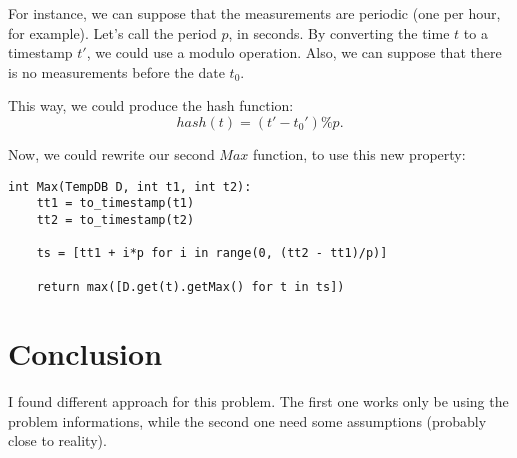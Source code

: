 		For instance, we can suppose that the measurements are periodic (one per hour, for example). Let's call the period $p$, in seconds.
		By converting the time $t$ to a timestamp $t'$, we could use a modulo operation.
		Also, we can suppose that there is no measurements before the date $t_0$.

		This way, we could produce the hash function:\[hash(t) = (t' - t_0') \% p .\]

		Now, we could rewrite our second $Max$ function, to use this new property:
\begin{lstlisting}
int Max(TempDB D, int t1, int t2):
	tt1 = to_timestamp(t1)
	tt2 = to_timestamp(t2)

	ts = [tt1 + i*p for i in range(0, (tt2 - tt1)/p)]

	return max([D.get(t).getMax() for t in ts])
\end{lstlisting}

\section{Conclusion}
	I found different approach for this problem. The first one works only be using the problem informations, while the second one need some assumptions (probably close to reality).